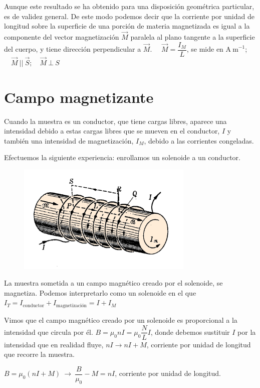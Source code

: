 Aunque este resultado se ha obtenido para una disposición geométrica particular, es de validez general. De este modo podemos decir que
la corriente por unidad de longitud sobre la superficie de una porción de materia magnetizada es igual a la componente del vector magnetización $\vec M$ paralela al plano tangente a la superficie del cuerpo, y tiene dirección perpendicular a $\vec M$.
$\quad \vec M=\dfrac {I_M} L$, se mide en $\mathrm{A\ m}^{-1}$; $\quad \vec M \ || \ \vec S;\quad \vec M \ \bot \ S$

\section{Campo magnetizante}

Cuando la muestra es un conductor, que tiene cargas libres, aparece una intensidad debido a estas cargas libres que se mueven en el conductor, $I$ y también una intensidad de magnetización, $I_M$, debido a las corrientes congeladas.

Efectuemos la siguiente experiencia: enrollamos un solenoide a un conductor.

\begin{figure}[H]
	\centering
	\includegraphics[width=0.75\textwidth]{imagenes/imagenes27/T27IM10.png}
\end{figure}

La muestra sometida a un campo magnético creado por el solenoide, se magnetiza. Podemos interpretarlo como un solenoide en el que $I_T=I_{\text{conductor}}+I_{\text{magnetización}}=I+I_M$

Vimos que el campo magnético creado por un solenoide es proporcional a la intensidad que circula por él.
$B=\mu_0 n I=\mu_0 \dfrac N L I$, donde debemos sustituir $I$ por la intensidad que en realidad fluye, $nI \to nI+M$, corriente por unidad de longitud que recorre la muestra.

$B=\mu_0 (nI+M) \ \to \ \dfrac B{\mu_0}-M=nI$, corriente por unidad de longitud.

